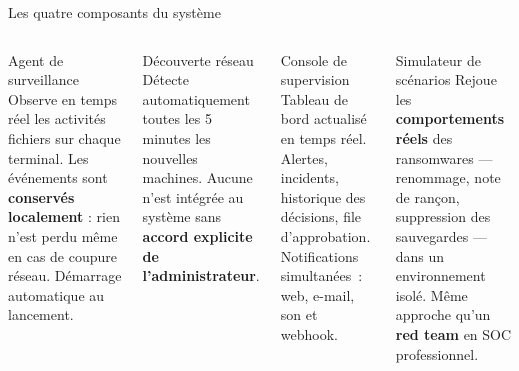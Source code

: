 \documentclass[aspectratio=169,t,10pt]{beamer}
\begin{document}

\begin{frame}{Les quatre composants du système}

  \begin{columns}[T]
      \begin{block}{\faCode\quad Agent de surveillance}
        \small Observe en temps réel les activités fichiers sur chaque terminal.
        Les événements sont \textbf{conservés localement} : rien n'est perdu
        même en cas de coupure réseau. Démarrage automatique au lancement.
      \end{block}
      \vspace{4pt}
      \begin{block}{\faNetworkWired\quad Découverte réseau}
        \small Détecte automatiquement toutes les 5 minutes les nouvelles machines.
        Aucune n'est intégrée au système sans \textbf{accord explicite de l'administrateur}.
      \end{block}

      \begin{block}{\faDesktop\quad Console de supervision}
        \small Tableau de bord actualisé en temps réel.
        Alertes, incidents, historique des décisions, file d'approbation.
        Notifications simultanées~: web, e-mail, son et webhook.
      \end{block}
      \vspace{4pt}
      \begin{block}{\faFlask\quad Simulateur de scénarios}
        \small Rejoue les \textbf{comportements réels} des ransomwares — renommage, note de rançon,
        suppression des sauvegardes — dans un environnement isolé.
        Même approche qu'un \textbf{red team} en SOC professionnel.
      \end{block}
  \end{columns}

\end{frame}
\end{document}
